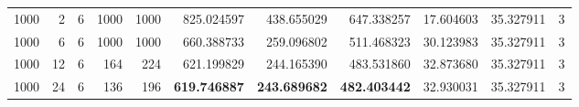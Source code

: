 \begin{table}
\begin{tabular}{rrrrrrrrrrr}
1000 & 2 & 6 & 1000 & 1000 & 825.024597 & 438.655029 & 647.338257 & 17.604603 & 35.327911 & 3 \\
1000 & 6 & 6 & 1000 & 1000 & 660.388733 & 259.096802 & 511.468323 & 30.123983 & 35.327911 & 3 \\
1000 & 12 & 6 & 164 & 224 & 621.199829 & 244.165390 & 483.531860 & 32.873680 & 35.327911 & 3 \\
1000 & 24 & 6 & 136 & 196 & \textbf{619.746887} & \textbf{243.689682} & \textbf{482.403442} & 32.930031 & 35.327911 & 3 \\
\bottomrule
\end{tabular}
\end{table}

